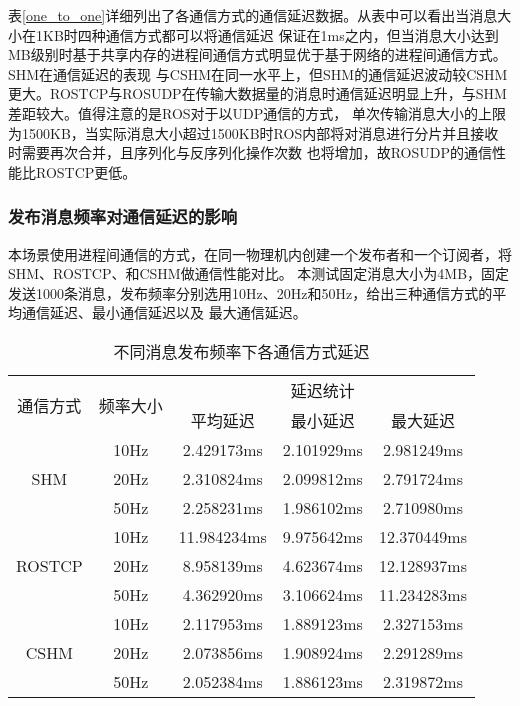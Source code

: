 表\ref{one_to_one}详细列出了各通信方式的通信延迟数据。从表中可以看出当消息大小在1KB时四种通信方式都可以将通信延迟
保证在1ms之内，但当消息大小达到MB级别时基于共享内存的进程间通信方式明显优于基于网络的进程间通信方式。SHM在通信延迟的表现
与CSHM在同一水平上，但SHM的通信延迟波动较CSHM更大。ROSTCP与ROSUDP在传输大数据量的消息时通信延迟明显上升，与SHM差距较大。值得注意的是ROS对于以UDP通信的方式，
单次传输消息大小的上限为1500KB，当实际消息大小超过1500KB时ROS内部将对消息进行分片并且接收时需要再次合并，且序列化与反序列化操作次数
也将增加，故ROSUDP的通信性能比ROSTCP更低。

\subsubsection{发布消息频率对通信延迟的影响}
本场景使用进程间通信的方式，在同一物理机内创建一个发布者和一个订阅者，将SHM、ROSTCP、和CSHM做通信性能对比。
本测试固定消息大小为4MB，固定发送1000条消息，发布频率分别选用10Hz、20Hz和50Hz，给出三种通信方式的平均通信延迟、最小通信延迟以及
最大通信延迟。

\begin{table}[htb]
  \centering\small
  \caption{不同消息发布频率下各通信方式延迟}
  \renewcommand\arraystretch{1.2}
  \label{frequency_test}
  \begin{tabular}{ccccc}
    \toprule
    \multirow{2}{*}{通信方式} & \multirow{2}{*}{频率大小} & \multicolumn{3}{c}{延迟统计}\\
    \cline{3-5}
     & & 平均延迟 & 最小延迟 & 最大延迟\\
    \midrule
    \multirow{3}{*}{SHM} & 10Hz& 2.429173ms& 2.101929ms& 2.981249ms\\ & 20Hz & 2.310824ms & 2.099812ms & 2.791724ms \\ & 50Hz & 2.258231ms & 1.986102ms & 2.710980ms \\
    \hline
    \multirow{3}{*}{ROSTCP} & 10Hz& 11.984234ms& 9.975642ms& 12.370449ms\\ & 20Hz & 8.958139ms & 4.623674ms & 12.128937ms \\ & 50Hz & 4.362920ms & 3.106624ms & 11.234283ms \\
    \hline
    \multirow{3}{*}{CSHM} & 10Hz& 2.117953ms& 1.889123ms& 2.327153ms\\ & 20Hz & 2.073856ms & 1.908924ms & 2.291289ms \\ & 50Hz & 2.052384ms & 1.886123ms & 2.319872ms \\
    \bottomrule
  \end{tabular}
\end{table}

